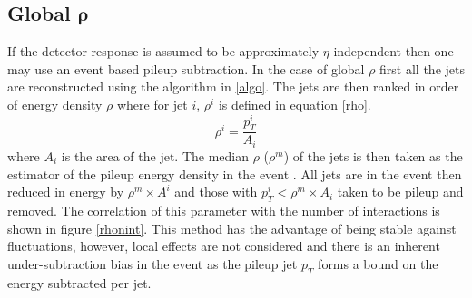 \subsection{Global $\boldsymbol{\rho}$}
If the detector response is assumed to be approximately $\eta$ independent then one may use an event based pileup subtraction. In the case of global $\rho$ first all the jets are reconstructed using the algorithm in \ref{algo}. The jets are then ranked in order of energy density $\rho$ where for jet $i$, $\rho^i$ is defined in equation \ref{rho}.
\begin{equation}
\label{rho}
\rho^i = \frac{p^i_{T}}{A_i} 
\end{equation}
where $A_i$ is the area of the jet. The median $\rho$ ($\rho^m$) of the jets is then taken as the estimator of the pileup energy density in the event \cite{jetarea}. All jets are in the event then reduced in energy by $\rho^m \times A^i$ and those with $p_{T}^i < \rho^m \times A_i$ taken to be pileup and removed. The correlation of this parameter with the number of interactions is shown in figure \ref{rhonint}. This method has the advantage of being stable against fluctuations, however, local effects are not considered and there is an inherent under-subtraction bias in the event as the pileup jet $p_{T}$ forms a bound on the energy subtracted per jet.
